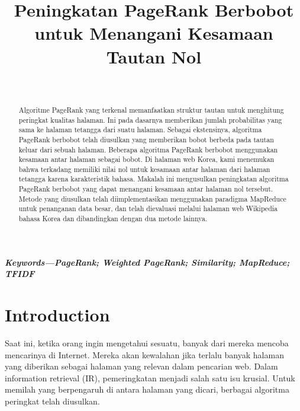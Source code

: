 \documentclass[conference]{IEEEtran}
\title{\textbf{Peningkatan PageRank Berbobot untuk Menangani Kesamaan Tautan Nol}}
\author{\IEEEauthorblockN{Muhammad Rahmadi Husada}\\
\IEEEauthorblockA{Fakultas Teknologi Informasi\\
Institut Teknologi Batam\\
Batam, Kepulauan Riau, Indonesia\\
2022027@student.iteba.ac.id}}
\begin{document}
\maketitle

\begin{abstract}
    Algoritme PageRank yang terkenal memanfaatkan struktur tautan untuk menghitung peringkat kualitas halaman. Ini pada dasarnya memberikan jumlah probabilitas yang sama ke halaman tetangga dari suatu halaman. Sebagai ekstensinya, algoritma PageRank berbobot telah diusulkan yang memberikan bobot berbeda pada tautan keluar dari sebuah halaman. Beberapa algoritma PageRank berbobot menggunakan kesamaan antar halaman sebagai bobot. Di halaman web Korea, kami menemukan bahwa terkadang memiliki nilai nol untuk kesamaan antar halaman dari halaman tetangga karena karakteristik bahasa. Makalah ini mengusulkan peningkatan algoritma PageRank berbobot yang dapat menangani kesamaan antar halaman nol tersebut. Metode yang diusulkan telah diimplementasikan menggunakan paradigma MapReduce untuk penanganan data besar, dan telah dievaluasi melalui halaman web Wikipedia bahasa Korea dan dibandingkan dengan dua metode lainnya.

\end{abstract}\hspace{10pt}

\textbf{\textit{Keywords---PageRank; Weighted PageRank; Similarity; MapReduce; TFIDF}}
\section{Introduction}
Saat ini, ketika orang ingin mengetahui sesuatu, banyak dari mereka mencoba mencarinya di Internet. Mereka akan kewalahan jika terlalu banyak halaman yang diberikan sebagai halaman yang relevan dalam pencarian web. Dalam information retrieval (IR), pemeringkatan menjadi salah satu isu krusial. Untuk memilah yang berpengaruh di antara halaman yang dicari, berbagai algoritma peringkat telah diusulkan. \cite{brin1998anatomy,xing2004weighted,qiao2010simrank,page1999pagerank,kumar2013pagerank,duhan2009page,najork2007comparing,kumar2011page,nemirovsky2008weighted,tyagi2012weighted,haveliwala2003topic}
\end{document}
